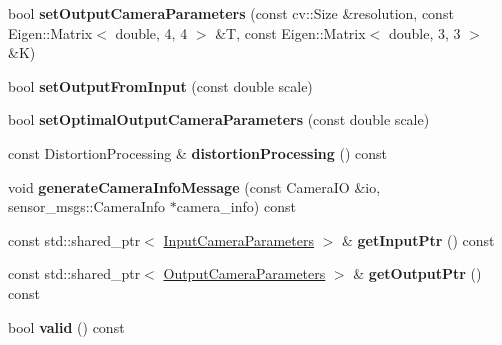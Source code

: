 \begin{DoxyCompactItemize}
bool {\bfseries set\+Output\+Camera\+Parameters} (const cv\+::\+Size \&resolution, const Eigen\+::\+Matrix$<$ double, 4, 4 $>$ \&T, const Eigen\+::\+Matrix$<$ double, 3, 3 $>$ \&K)
\item 
\mbox{\label{classimage__undistort_1_1CameraParametersPair_a76f1696eb8e468dc26f9cd60893d1eca}} 
bool {\bfseries set\+Output\+From\+Input} (const double scale)
\item 
\mbox{\label{classimage__undistort_1_1CameraParametersPair_ab1392597334cbe8286cbc1903b197d5f}} 
bool {\bfseries set\+Optimal\+Output\+Camera\+Parameters} (const double scale)
\item 
\mbox{\label{classimage__undistort_1_1CameraParametersPair_ad54793186833d6a8b8f5834f73305b40}} 
const Distortion\+Processing \& {\bfseries distortion\+Processing} () const
\item 
\mbox{\label{classimage__undistort_1_1CameraParametersPair_a5dc61d00a297a78d2be1bc49eace3736}} 
void {\bfseries generate\+Camera\+Info\+Message} (const Camera\+IO \&io, sensor\+\_\+msgs\+::\+Camera\+Info $\ast$camera\+\_\+info) const
\item 
\mbox{\label{classimage__undistort_1_1CameraParametersPair_ac874db6136c57afb3ab30e818d501975}} 
const std\+::shared\+\_\+ptr$<$ \hyperlink{classimage__undistort_1_1InputCameraParameters}{Input\+Camera\+Parameters} $>$ \& {\bfseries get\+Input\+Ptr} () const
\item 
\mbox{\label{classimage__undistort_1_1CameraParametersPair_ac9d8e14065c1e8b98eecaea4a209253e}} 
const std\+::shared\+\_\+ptr$<$ \hyperlink{classimage__undistort_1_1OutputCameraParameters}{Output\+Camera\+Parameters} $>$ \& {\bfseries get\+Output\+Ptr} () const
\item 
\mbox{\label{classimage__undistort_1_1CameraParametersPair_a11bd354b0961ecf37939dcc9668c9e69}} 
bool {\bfseries valid} () const
\item 
\mbox{\label{classimage__undistort_1_1CameraParametersPair_ab80fb96d3419762f23a6f10a67e848c7}} 

\end{DoxyCompactItemize}
